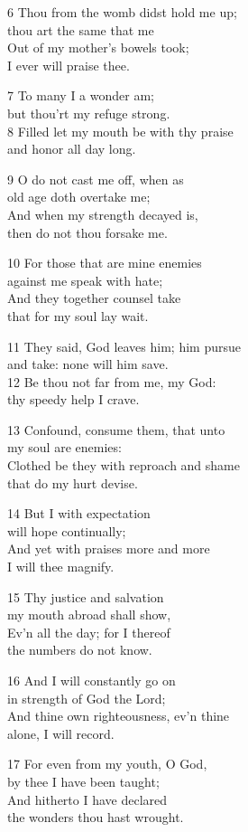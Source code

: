 \begin{multicols}{3}
6 Thou from the womb didst hold me up;\\
thou art the same that me\\
Out of my mother’s bowels took;\\
I ever will praise thee.

7 To many I a wonder am;\\
but thou’rt my refuge strong.\\
8 Filled let my mouth be with thy praise\\
and honor all day long.

9 O do not cast me off, when as\\
old age doth overtake me;\\
And when my strength decayed is,\\
then do not thou forsake me.

10 For those that are mine enemies\\
against me speak with hate;\\
And they together counsel take\\
that for my soul lay wait.

11 They said, God leaves him; him pursue\\
and take: none will him save.\\
12 Be thou not far from me, my God:\\
thy speedy help I crave.

13 Confound, consume them, that unto\\
my soul are enemies:\\
Clothed be they with reproach and shame\\
that do my hurt devise.

14 But I with expectation\\
will hope continually;\\
And yet with praises more and more\\
I will thee magnify.

15 Thy justice and salvation\\
my mouth abroad shall show,\\
Ev’n all the day; for I thereof\\
the numbers do not know.

16 And I will constantly go on\\
in strength of God the Lord;\\
And thine own righteousness, ev’n thine\\
alone, I will record.

17 For even from my youth, O God,\\
by thee I have been taught;\\
And hitherto I have declared\\
the wonders thou hast wrought.


\end{multicols}
